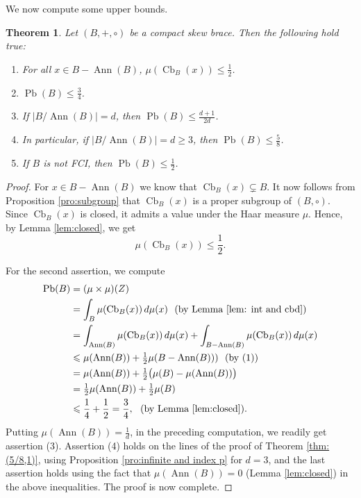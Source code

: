 \documentclass[oneside]{amsart}
\numberwithin{equation}{section}
\theoremstyle{plain}
\newtheorem{thm}[equation]{Theorem}
\theoremstyle{definition}
\newcommand{\Cb}{\operatorname{Cb} }
\newcommand{\Pb}{\operatorname{Pb} }
\newcommand{\Ann}{\operatorname{Ann} }
\begin{document}
We now compute some upper bounds.

\begin{thm}\label{lem: measure of centralizer}
Let $(B,+, \circ)$ be a compact   skew brace. Then the following hold true:
\begin{enumerate}
 \item  For all   $x \in B-\Ann(B)$,  $\mu(\Cb_{B}(x))\leqslant \frac{1}{2}$.
 \item  $\Pb(B)\leqslant \frac{3}{4}$.
 \item If $|B/\Ann(B)|=d$, then  $\Pb(B)\leqslant \frac{d+1}{2d}$.
 \item  In particular, if $|B/\Ann(B)|= d \ge 3$, then $\Pb(B) \leqslant \frac{5}{8}$.
 \item  If $B$ is not  FCI, then $\Pb(B)\leqslant \frac{1}{2}$.
\end{enumerate}
\end{thm}
\begin{proof}
For $x\in B-\Ann(B)$ we know that $\Cb_{B}(x) \subsetneq B$. It now follows from  Proposition \ref{pro:subgroup} that  $\Cb_{B}(x)$ is   a proper subgroup of $(B,\circ)$. Since  $\Cb_{B}(x)$ is   closed, it admits a value under  the Haar measure $\mu$. Hence, by Lemma \ref{lem:closed}, we get   $$ \mu(\Cb_{B}(x))\leqslant \frac{1}{2}.$$  

For the second assertion, we compute
\begin{align*}
    \Pb(B) &= (\mu \times \mu)(Z)\\
           &= \int_{B} \mu(\Cb_{B}(x)) \, d\mu(x)~~(\text{by Lemma }\ref{lem: int and cbd})\\
           &= \int_{\Ann(B)} \mu(\Cb_{B}(x)) \, d\mu(x) + \int_{B - \Ann(B)} \mu(\Cb_{B}(x)) \, d\mu(x)\\
           & \leqslant \mu(\Ann(B)) + \tfrac{1}{2}\mu(B - \Ann(B)))~~(\text{by (1)})\\
           & = \mu(\Ann(B)) + \tfrac{1}{2}\big(\mu(B) - \mu(\Ann(B))\big)\\
           &= \tfrac{1}{2}\mu(\Ann(B)) + \tfrac{1}{2}\mu(B)\\
           &\leqslant \frac{1}{4}+\frac{1}{2} = \frac{3}{4},~~(\text{by Lemma }\ref{lem:closed}).    
\end{align*}
Putting $\mu(\Ann(B)) = \frac{1}{d}$, in the preceding computation, we readily get assertion (3). Assertion (4) holds on the lines of the proof of Theorem \ref{thm: (5/8,1)}, using Proposition \ref{pro:infinite and index p} for $d = 3$, and the last  assertion holds using the fact that $\mu(\Ann(B)) = 0$ (Lemma \ref{lem:closed}) in the above inequalities. The proof is now complete.
\end{proof}
\end{document}
